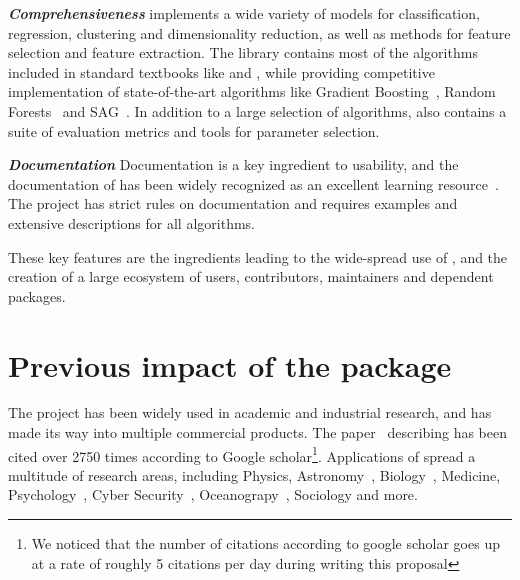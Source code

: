 \emph{\textbf{Comprehensiveness}} \sklearn{} implements a wide variety of models for classification,
regression, clustering and dimensionality reduction, as well as methods for feature
selection and feature extraction. The library contains most of the algorithms included
in standard textbooks like \textcite{bishop2001bishop} and
\textcite{friedman2001elements}, while providing competitive implementation of
state-of-the-art algorithms like Gradient
Boosting~\autocite{friedman2001greedy}, Random
Forests~\autocite{breiman2001random} and SAG~\autocite{roux2012stochastic}.  In
addition to a large selection of algorithms, \sklearn{} also contains a suite
of evaluation metrics and tools for parameter selection.

\emph{\textbf{Documentation}}
Documentation is a key ingredient to usability, and the documentation of \sklearn{}
has been widely recognized as an excellent learning
resource~\textcite{testimonials, benlorica, kdnuggetstopten, lovesklearn}. The
\sklearn{} project has strict rules on documentation and requires examples and
extensive descriptions for all algorithms.

These key features are the ingredients leading to the wide-spread use of
\sklearn{}, and the creation of a large ecosystem of users, contributors,
maintainers and dependent packages.

\section{Previous impact of the \sklearn{} package}
The \sklearn{} project has been widely used in academic and industrial research,
and has made its way into multiple commercial products. The
paper~\autocite{pedregosa2011scikit} describing \sklearn{} has been cited over 2750 times
according to Google scholar\footnote{We noticed that the number of citations
according to google scholar goes up at a rate of roughly 5 citations per day
during writing this proposal}. Applications of \sklearn{} spread
a multitude of research areas, including Physics, Astronomy~\autocite{pereira2013spectrophotometric, bennett20141},
Biology~\autocite{misof2014phylogenomics, ritchie2014functional}, Medicine,
Psychology~\autocite{park2015automatic,doehrmann2013predicting}, Cyber
Security~\autocite{sahs2012machine},
Oceanograpy~\autocite{sunagawa2015structure}, Sociology and more.

